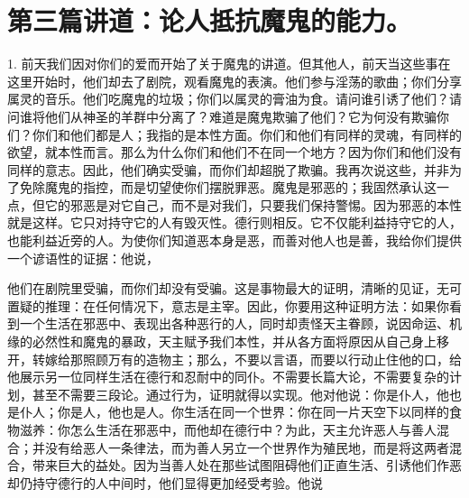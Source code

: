 
\section{第三篇讲道：论人抵抗魔鬼的能力。}

\par

1. 前天我们因对你们的爱而开始了关于魔鬼的讲道。但其他人，前天当这些事在这里开始时，他们却去了剧院，观看魔鬼的表演。他们参与淫荡的歌曲；你们分享属灵的音乐。他们吃魔鬼的垃圾；你们以属灵的膏油为食。请问谁引诱了他们？请问谁将他们从神圣的羊群中分离了？难道是魔鬼欺骗了他们？它为何没有欺骗你们？你们和他们都是人；我指的是本性方面。你们和他们有同样的灵魂，有同样的欲望，就本性而言。那么为什么你们和他们不在同一个地方？因为你们和他们没有同样的意志。因此，他们确实受骗，而你们却超脱了欺骗。我再次说这些，并非为了免除魔鬼的指控，而是切望使你们摆脱罪恶。魔鬼是邪恶的；我固然承认这一点，但它的邪恶是对它自己，而不是对我们，只要我们保持警惕。因为邪恶的本性就是这样。它只对持守它的人有毁灭性。德行则相反。它不仅能利益持守它的人，也能利益近旁的人。为使你们知道恶本身是恶，而善对他人也是善，我给你们提供一个谚语性的证据：他说，\par

他们在剧院里受骗，而你们却没有受骗。这是事物最大的证明，清晰的见证，无可置疑的推理：在任何情况下，意志是主宰。因此，你要用这种证明方法：如果你看到一个生活在邪恶中、表现出各种恶行的人，同时却责怪天主眷顾，说因命运、机缘的必然性和魔鬼的暴政，天主赋予我们本性，并从各方面将原因从自己身上移开，转嫁给那照顾万有的造物主；那么，不要以言语，而要以行动止住他的口，给他展示另一位同样生活在德行和忍耐中的同仆。不需要长篇大论，不需要复杂的计划，甚至不需要三段论。通过行为，证明就得以实现。他对他说：你是仆人，他也是仆人；你是人，他也是人。你生活在同一个世界：你在同一片天空下以同样的食物滋养：你怎么生活在邪恶中，而他却在德行中？为此，天主允许恶人与善人混合；并没有给恶人一条律法，而为善人另立一个世界作为殖民地，而是将这两者混合，带来巨大的益处。因为当善人处在那些试图阻碍他们正直生活、引诱他们作恶却仍持守德行的人中间时，他们显得更加经受考验。他说\par


